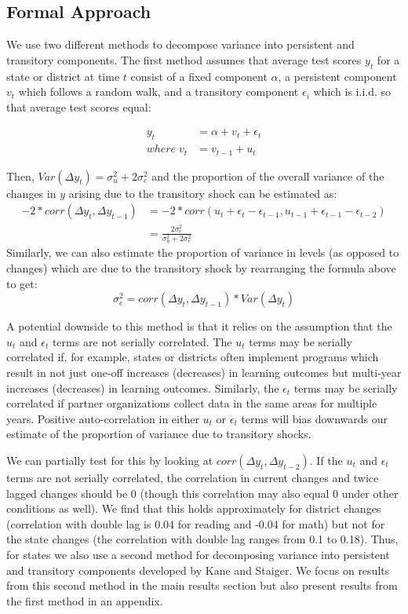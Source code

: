 \documentclass[
  11pt,
]{article}
\begin{document}
\hypertarget{formal-approach}{%
\subsection{Formal Approach}\label{formal-approach}}

We use two different methods to decompose variance into persistent and transitory components. The first method assumes that average test scores \(y_{t}\) for a state or district at time \({t}\) consist of a fixed component \(\alpha\), a persistent component \(v_{t}\) which follows a random walk, and a transitory component \(\epsilon_{i}\) which is i.i.d. so that average test scores equal:

\[ 
\begin{aligned}
y_{t} &= \alpha + v_{t} + \epsilon_{t} \\
where \; v_{t} &= v_{t-1} + u_{t}
\end{aligned}
\]

Then, \(Var(\Delta y_{t}) = \sigma^2_{u} + 2\sigma^2_{e}\) and the proportion of the overall variance of the changes in \(y\) arising due to the transitory shock can be estimated as:
\[
\begin{aligned}
  -2*corr(\Delta y_{t}, \Delta y_{t-1}) &= 
  -2*corr(u_{t} + \epsilon_{t} - \epsilon_{t-1},u_{t-1} + \epsilon_{t-1} - \epsilon_{t-2}) \\
  &= \frac{2\sigma^2_{e}}{\sigma^2_{u} + 2\sigma^2_{e}}
\end{aligned}
\]
Similarly, we can also estimate the proportion of variance in levels (as opposed to changes) which are due to the transitory shock by rearranging the formula above to get:
\[
\sigma^2_{e} = corr(\Delta y_{t}, \Delta y_{t-1}) *Var(\Delta y_{t})
\]

A potential downside to this method is that it relies on the assumption that the \(u_{t}\) and \(\epsilon_{t}\) terms are not serially correlated. The \(u_{t}\) terms may be serially correlated if, for example, states or districts often implement programs which result in not just one-off increases (decreases) in learning outcomes but multi-year increases (decreases) in learning outcomes. Similarly, the \(\epsilon_{t}\) terms may be serially correlated if partner organizations collect data in the same areas for multiple years. Positive auto-correlation in either \(u_{t}\) or \(\epsilon_{t}\) terms will bias downwards our estimate of the proportion of variance due to transitory shocks.

We can partially test for this by looking at \(corr(\Delta y_{t}, \Delta y_{t-2})\). If the \(u_{t}\) and \(\epsilon_{t}\) terms are not serially correlated, the correlation in current changes and twice lagged changes should be 0 (though this correlation may also equal 0 under other conditions as well). We find that this holds approximately for district changes (correlation with double lag is 0.04 for reading and -0.04 for math) but not for the state changes (the correlation with double lag ranges from 0.1 to 0.18). Thus, for states we also use a second method for decomposing variance into persistent and transitory components developed by Kane and Staiger. We focus on results from this second method in the main results section but also present results from the first method in an appendix.
\end{document}
